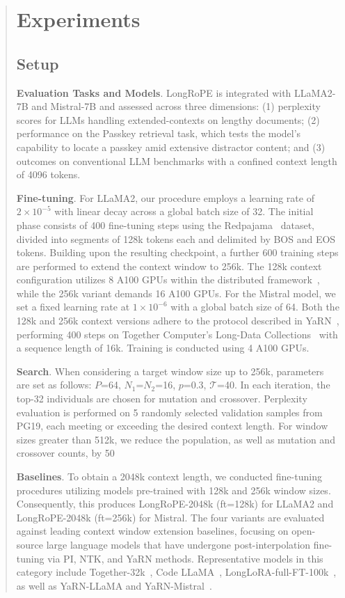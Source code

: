 \begin{abstract}
 \section{Experiments}

\subsection{Setup}
\textbf{Evaluation Tasks and Models}. LongRoPE is integrated with LLaMA2-7B and Mistral-7B and assessed across three dimensions: (1) perplexity scores for LLMs handling extended-contexts on lengthy documents; (2) performance on the Passkey retrieval task, which tests the model's capability to locate a passkey amid extensive distractor content; and (3) outcomes on conventional LLM benchmarks with a confined context length of 4096 tokens.

\textbf{Fine-tuning}. For LLaMA2, our procedure employs a learning rate of $2\times 10^{-5}$ with linear decay across a global batch size of 32. The initial phase consists of 400 fine-tuning steps using the Redpajama~\cite{redpajama} dataset, divided into segments of 128k tokens each and delimited by BOS and EOS tokens. Building upon the resulting checkpoint, a further 600 training steps are performed to extend the context window to 256k. The 128k context configuration utilizes 8 A100 GPUs within the distributed framework~\cite{cube}, while the 256k variant demands 16 A100 GPUs. For the Mistral model, we set a fixed learning rate at $1\times 10^{-6}$ with a global batch size of 64. Both the 128k and 256k context versions adhere to the protocol described in YaRN~\cite{yarn}, performing 400 steps on Together Computer’s Long-Data Collections~\cite{mistraldata} with a sequence length of 16k. Training is conducted using 4 A100 GPUs.

\textbf{Search}. When considering a target window size up to 256k, parameters are set as follows: $P$=64, $N_1$=$N_2$=16, $p$=0.3, $\mathcal{T}$=40. In each iteration, the top-32 individuals are chosen for mutation and crossover. Perplexity evaluation is performed on 5 randomly selected validation samples from PG19, each meeting or exceeding the desired context length. For window sizes greater than 512k, we reduce the population, as well as mutation and crossover counts, by 50%

\textbf{Baselines}. To obtain a 2048k context length, we conducted fine-tuning procedures utilizing models pre-trained with 128k and 256k window sizes. Consequently, this produces LongRoPE-2048k (ft=128k) for LLaMA2 and LongRoPE-2048k (ft=256k) for Mistral. The four variants are evaluated against leading context window extension baselines, focusing on open-source large language models that have undergone post-interpolation fine-tuning via PI, NTK, and YaRN methods. Representative models in this category include Together-32k~\cite{together}, Code LLaMA~\cite{codellama}, LongLoRA-full-FT-100k~\cite{longlora}, as well as YaRN-LLaMA and YaRN-Mistral~\cite{yarn}.


\end{abstract}
